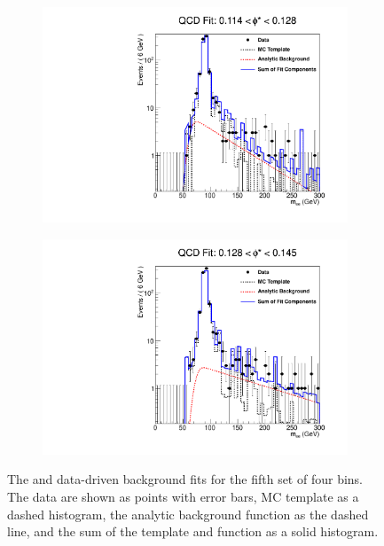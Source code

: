 \begin{figure}[!htbp]
\begin{subfigure}[b]{\SideBySidePlotWidth}
        \includegraphics[width=\linewidth]{figures/qcd_fits/qcd_fit_plot_for_19.pdf}
        \label{fig:qcd_fit_19}
    \end{subfigure}%
    \begin{subfigure}[b]{\SideBySidePlotWidth}
        \includegraphics[width=\linewidth]{figures/qcd_fits/qcd_fit_plot_for_20.pdf}
        \label{fig:qcd_fit_20}
    \end{subfigure}
    \caption[
        The \QCDjets and \wjets data-driven background fits for the fifth set of
        four \phistar bins.
    ]{
        The \QCDjets and \wjets data-driven background fits for the fifth set of
        four \phistar bins. The data are shown as points with error bars, MC
        template as a dashed histogram, the analytic background function as the
        dashed line, and the sum of the template and function as a solid
        histogram.
    }
    \label{fig:qcd_many_5}
\end{figure}

